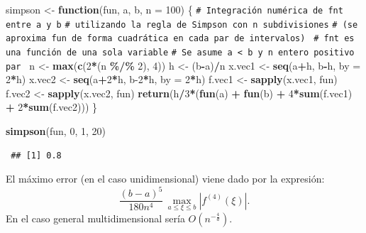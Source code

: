 \documentclass[
  spanish,
  10pt,
]{book}
\newenvironment{Shaded}{\begin{snugshade}}{\end{snugshade}}
\newcommand{\AttributeTok}[1]{\textcolor[rgb]{0.13,0.29,0.53}{#1}}
\newcommand{\CommentTok}[1]{\textcolor[rgb]{0.56,0.35,0.01}{\textit{#1}}}
\newcommand{\ControlFlowTok}[1]{\textcolor[rgb]{0.13,0.29,0.53}{\textbf{#1}}}
\newcommand{\DecValTok}[1]{\textcolor[rgb]{0.00,0.00,0.81}{#1}}
\newcommand{\FunctionTok}[1]{\textcolor[rgb]{0.13,0.29,0.53}{\textbf{#1}}}
\newcommand{\NormalTok}[1]{#1}
\newcommand{\OtherTok}[1]{\textcolor[rgb]{0.56,0.35,0.01}{#1}}
\newcommand{\SpecialCharTok}[1]{\textcolor[rgb]{0.81,0.36,0.00}{\textbf{#1}}}
\theoremstyle{break}
\theoremstyle{nonumberplain}
\renewcommand{\CommentTok}[1]{\textcolor[rgb]{0.41,0.41,0.41}{\texttt{#1}}}
\begin{document}
\begin{Shaded}
\begin{Highlighting}[]
\NormalTok{simpson }\OtherTok{\textless{}{-}} \ControlFlowTok{function}\NormalTok{(fun, a, b, }\AttributeTok{n =} \DecValTok{100}\NormalTok{) \{ }
\CommentTok{\# Integración numérica de fnt entre a y b}
\CommentTok{\# utilizando la regla de Simpson con n subdivisiones}
\CommentTok{\# (se aproxima fun de forma cuadrática en cada par de intervalos)  }
\CommentTok{\# fnt es una función de una sola variable}
\CommentTok{\# Se asume a \textless{} b y n entero positivo par }
\NormalTok{  n }\OtherTok{\textless{}{-}} \FunctionTok{max}\NormalTok{(}\FunctionTok{c}\NormalTok{(}\DecValTok{2}\SpecialCharTok{*}\NormalTok{(n }\SpecialCharTok{\%/\%} \DecValTok{2}\NormalTok{), }\DecValTok{4}\NormalTok{))}
\NormalTok{  h }\OtherTok{\textless{}{-}}\NormalTok{ (b}\SpecialCharTok{{-}}\NormalTok{a)}\SpecialCharTok{/}\NormalTok{n}
\NormalTok{  x.vec1 }\OtherTok{\textless{}{-}} \FunctionTok{seq}\NormalTok{(a}\SpecialCharTok{+}\NormalTok{h, b}\SpecialCharTok{{-}}\NormalTok{h, }\AttributeTok{by =} \DecValTok{2}\SpecialCharTok{*}\NormalTok{h)}
\NormalTok{  x.vec2 }\OtherTok{\textless{}{-}} \FunctionTok{seq}\NormalTok{(a}\SpecialCharTok{+}\DecValTok{2}\SpecialCharTok{*}\NormalTok{h, b}\DecValTok{{-}2}\SpecialCharTok{*}\NormalTok{h, }\AttributeTok{by =} \DecValTok{2}\SpecialCharTok{*}\NormalTok{h)}
\NormalTok{  f.vec1 }\OtherTok{\textless{}{-}} \FunctionTok{sapply}\NormalTok{(x.vec1, fun)}
\NormalTok{  f.vec2 }\OtherTok{\textless{}{-}} \FunctionTok{sapply}\NormalTok{(x.vec2, fun)}
  \FunctionTok{return}\NormalTok{(h}\SpecialCharTok{/}\DecValTok{3}\SpecialCharTok{*}\NormalTok{(}\FunctionTok{fun}\NormalTok{(a) }\SpecialCharTok{+} \FunctionTok{fun}\NormalTok{(b) }\SpecialCharTok{+} \DecValTok{4}\SpecialCharTok{*}\FunctionTok{sum}\NormalTok{(f.vec1) }\SpecialCharTok{+} \DecValTok{2}\SpecialCharTok{*}\FunctionTok{sum}\NormalTok{(f.vec2)))}
\NormalTok{\}}

\FunctionTok{simpson}\NormalTok{(fun, }\DecValTok{0}\NormalTok{, }\DecValTok{1}\NormalTok{, }\DecValTok{20}\NormalTok{)}
\end{Highlighting}
\end{Shaded}

\begin{verbatim}
 ## [1] 0.8
\end{verbatim}

El máximo error (en el caso unidimensional) viene dado por la expresión:
\[\frac{(b-a)^5}{180n^4}\,\max_{a\leq \xi \leq b}\left| f^{(4)}(\xi) \right|.\]
En el caso general multidimensional sería \(O(n^{-\frac{4}{d}})\).
\end{document}
